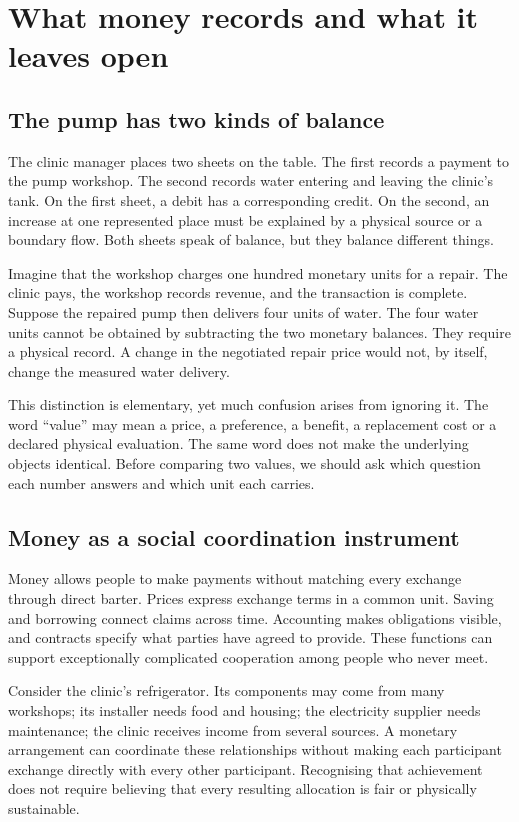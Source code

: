 \chapter{What money records and what it leaves open}\label{ch:money}

\section{The pump has two kinds of balance}
The clinic manager places two sheets on the table. The first records a payment to the pump workshop. The second records water entering and leaving the clinic's tank. On the first sheet, a debit has a corresponding credit. On the second, an increase at one represented place must be explained by a physical source or a boundary flow. Both sheets speak of balance, but they balance different things.

Imagine that the workshop charges one hundred monetary units for a repair. The clinic pays, the workshop records revenue, and the transaction is complete. Suppose the repaired pump then delivers four units of water. The four water units cannot be obtained by subtracting the two monetary balances. They require a physical record. A change in the negotiated repair price would not, by itself, change the measured water delivery.

This distinction is elementary, yet much confusion arises from ignoring it. The word ``value'' may mean a price, a preference, a benefit, a replacement cost or a declared physical evaluation. The same word does not make the underlying objects identical. Before comparing two values, we should ask which question each number answers and which unit each carries.

\section{Money as a social coordination instrument}
Money allows people to make payments without matching every exchange through direct barter. Prices express exchange terms in a common unit. Saving and borrowing connect claims across time. Accounting makes obligations visible, and contracts specify what parties have agreed to provide. These functions can support exceptionally complicated cooperation among people who never meet.

Consider the clinic's refrigerator. Its components may come from many workshops; its installer needs food and housing; the electricity supplier needs maintenance; the clinic receives income from several sources. A monetary arrangement can coordinate these relationships without making each participant exchange directly with every other participant. Recognising that achievement does not require believing that every resulting allocation is fair or physically sustainable.


